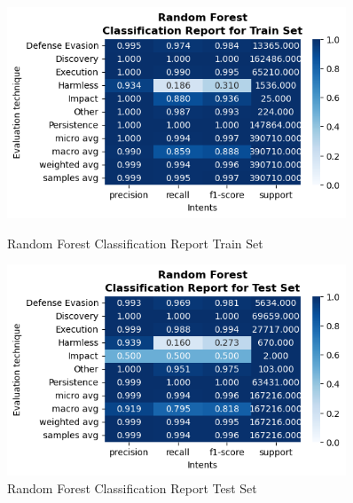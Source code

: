 \begin{figure}[H]
            \vspace{0.5cm}  %

            \begin{minipage}{\textwidth}
                \begin{minipage}[t]{0.48\textwidth}
                    \centering
                    \includegraphics[width=0.9\textwidth]{../figures/plots/section2/Random Forest_classification_report_for_Train_set.png}
                    \caption{Random Forest Classification Report Train Set}
                    \label{fig:}
                \end{minipage}%
                \hfill%
                \begin{minipage}[t]{0.48\textwidth}
                    \centering
                    \includegraphics[width=0.9\textwidth]{../figures/plots/section2/Random Forest_classification_report_for_Test_set.png}
                    \caption{Random Forest Classification Report Test Set}
                    \label{fig:}
                \end{minipage}  
            
            \end{minipage}
            
        \end{figure}
            
